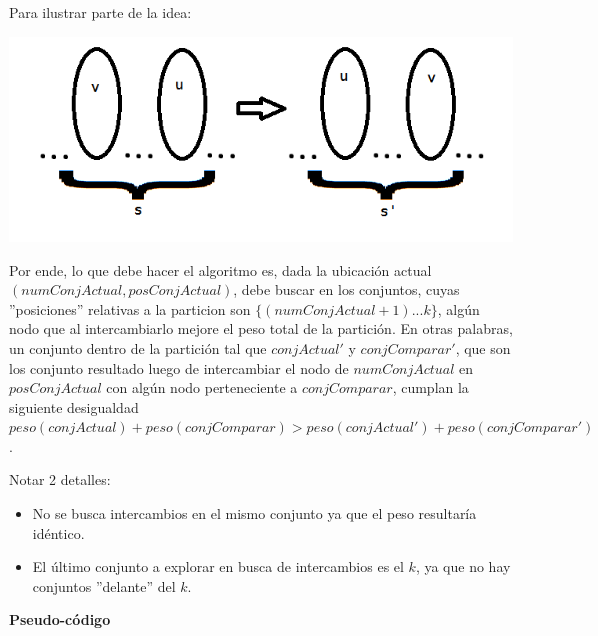 \documentclass[10pt,a4paper]{article}
\begin{document}
Para ilustrar parte de la idea:

\includegraphics[scale=0.75]{Vecindad1.png}

Por ende, lo que debe hacer el algoritmo es, dada la ubicación actual $(numConjActual, posConjActual)$, debe buscar en los conjuntos, cuyas ''posiciones'' relativas a la particion son $\{(numConjActual+1)...k\}$, algún nodo que al intercambiarlo mejore el peso total de la partición. En otras palabras, un conjunto dentro de la partición tal que $conjActual'$ y $conjComparar'$, que son los conjunto resultado luego de intercambiar el nodo de $numConjActual$ en $posConjActual$ con algún nodo perteneciente a $conjComparar$, cumplan la siguiente desigualdad $peso(conjActual) + peso(conjComparar) > peso(conjActual') + peso(conjComparar')$.

Notar 2 detalles:

\begin{itemize}
\item No se busca intercambios en el mismo conjunto ya que el peso resultaría idéntico.
\item El último conjunto a explorar en busca de intercambios es el $k$, ya que no hay conjuntos ''delante'' del $k$.
\end{itemize}

\hfill \newpage
\textbf{Pseudo-código}
\end{document}
